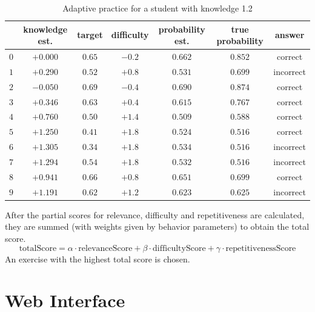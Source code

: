 \documentclass[12pt, twoside]{fithesis2}
\renewcommand{\_}{\leavevmode \kern0.07em\vbox{\hrule width0.4em}}
\begin{document}
\begin{table}[h]
\begin{center}
\begin{tabular}{| c | c | c | c | c | c | c |}
  \hline
  & knowledge est. &  target & difficulty & probability est. & true probability & answer\\
  \hline
  $0$ & $+0.000$ & $0.65$ & $-0.2$ & $0.662$ & $0.852$ &  correct   \\
  $1$ & $+0.290$ & $0.52$ & $+0.8$ & $0.531$ & $0.699$ &  incorrect \\
  $2$ & $-0.050$ & $0.69$ & $-0.4$ & $0.690$ & $0.874$ &  correct   \\
  $3$ & $+0.346$ & $0.63$ & $+0.4$ & $0.615$ & $0.767$ &  correct   \\
  $4$ & $+0.760$ & $0.50$ & $+1.4$ & $0.509$ & $0.588$ &  correct   \\
  $5$ & $+1.250$ & $0.41$ & $+1.8$ & $0.524$ & $0.516$ &  correct   \\
  $6$ & $+1.305$ & $0.34$ & $+1.8$ & $0.534$ & $0.516$ &  incorrect \\
  $7$ & $+1.294$ & $0.54$ & $+1.8$ & $0.532$ & $0.516$ &  incorrect \\
  $8$ & $+0.941$ & $0.66$ & $+0.8$ & $0.651$ & $0.699$ &  correct   \\
  $9$ & $+1.191$ & $0.62$ & $+1.2$ & $0.623$ & $0.625$ &  incorrect \\
  \hline
\end{tabular}
\end{center}
\caption{Adaptive practice for a student with knowledge 1.2}
\label{tbl:practice-example}
\end{table}


After the partial scores for relevance, difficulty and repetitiveness are calculated,
they are summed (with weights given by behavior parameters) to obtain the total score.
$$
\text{totalScore} = \alpha \cdot \text{relevanceScore} + \beta \cdot \text{difficultyScore} + \gamma \cdot \text{repetitivenessScore}
$$
An exercise with the highest total score is chosen.





\section{Web Interface}
\label{sec:smartoo-web}
\end{document}
